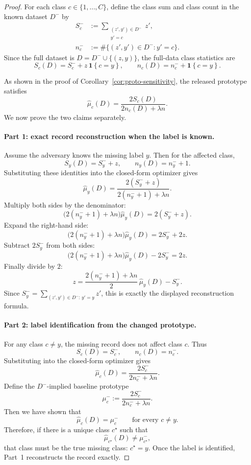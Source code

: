 \documentclass[11pt,a4paper]{report}
\theoremstyle{plain}
\theoremstyle{definition}
\theoremstyle{remark}
\newcommand{\ind}[1]{\mathbf{1}\!\left\{#1\right\}}
\begin{document}
\begin{proof}
For each class $c\in\{1,\dots,C\}$, define the class sum and class count in the known dataset $D^-$ by
\[
\begin{aligned}
S_c^-
&:= \sum_{\substack{(z',y')\in D^-\\ y'=c}} z',
\\
n_c^-
&:= \#\{(z',y')\in D^- : y'=c\}.
\end{aligned}
\]
Since the full dataset is $D=D^-\cup\{(z,y)\}$, the full-data class statistics are
\[
S_c(D)=S_c^-+z\,\ind{c=y},
\qquad
n_c(D)=n_c^-+\ind{c=y}.
\]

As shown in the proof of Corollary~\ref{cor:proto-sensitivity}, the released prototype satisfies
\[
\widehat\mu_c(D)=\frac{2S_c(D)}{2n_c(D)+\lambda n}.
\]
We now prove the two claims separately.

\paragraph{Part 1: exact record reconstruction when the label is known.}
Assume the adversary knows the missing label $y$. Then for the affected class,
\[
S_y(D)=S_y^-+z,
\qquad
n_y(D)=n_y^-+1.
\]
Substituting these identities into the closed-form optimizer gives
\[
\widehat\mu_y(D)=\frac{2(S_y^-+z)}{2(n_y^-+1)+\lambda n}.
\]
Multiply both sides by the denominator:
\[
\bigl(2(n_y^-+1)+\lambda n\bigr)\widehat\mu_y(D)=2(S_y^-+z).
\]
Expand the right-hand side:
\[
\bigl(2(n_y^-+1)+\lambda n\bigr)\widehat\mu_y(D)=2S_y^-+2z.
\]
Subtract $2S_y^-$ from both sides:
\[
\bigl(2(n_y^-+1)+\lambda n\bigr)\widehat\mu_y(D)-2S_y^-=2z.
\]
Finally divide by $2$:
\[
z=\frac{2(n_y^-+1)+\lambda n}{2}\,\widehat\mu_y(D)-S_y^-.
\]
Since $S_y^-=
\sum_{(z',y')\in D^-:\,y'=y} z'$, this is exactly the displayed reconstruction formula.

\paragraph{Part 2: label identification from the changed prototype.}
For any class $c\neq y$, the missing record does not affect class $c$. Thus
\[
S_c(D)=S_c^-,
\qquad
n_c(D)=n_c^-.
\]
Substituting into the closed-form optimizer gives
\[
\widehat\mu_c(D)=\frac{2S_c^-}{2n_c^-+\lambda n}.
\]
Define the $D^-$-implied baseline prototype
\[
\mu_c^-:=\frac{2S_c^-}{2n_c^-+\lambda n}.
\]
Then we have shown that
\[
\widehat\mu_c(D)=\mu_c^- \qquad \text{for every }c\neq y.
\]
Therefore, if there is a unique class $c^\star$ such that
\[
\widehat\mu_{c^\star}(D)\neq \mu_{c^\star}^-,
\]
that class must be the true missing class: $c^\star=y$. Once the label is identified, Part~1 reconstructs the record exactly.


\end{proof}
\end{document}
